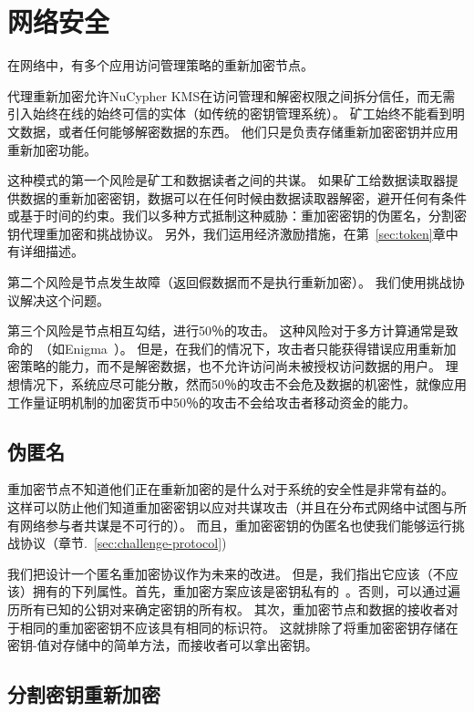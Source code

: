 \documentclass[longbibliography,nofootinbib]{revtex4-1}
\begin{document}
\section{网络安全}

在网络中，有多个应用访问管理策略的重新加密节点。

    代理重新加密允许NuCypher KMS在访问管理和解密权限之间拆分信任，而无需引入始终在线的始终可信的实体（如传统的密钥管理系统）。 矿工始终不能看到明文数据，或者任何能够解密数据的东西。 他们只是负责存储重新加密密钥并应用重新加密功能。
    
    这种模式的第一个风险是矿工和数据读者之间的共谋。 如果矿工给数据读取器提供数据的重新加密密钥，数据可以在任何时候由数据读取器解密，避开任何有条件或基于时间的约束。我们以多种方式抵制这种威胁：重加密密钥的伪匿名，分割密钥代理重加密和挑战协议。 另外，我们运用经济激励措施，在第~\ref{sec:token}章中有详细描述。

第二个风险是节点发生故障（返回假数据而不是执行重新加密）。 我们使用挑战协议解决这个问题。

第三个风险是节点相互勾结，进行50％的攻击。 这种风险对于多方计算通常是致命的~\cite{vitalik-secret-dao}（如Enigma~\cite{enigma}）。 但是，在我们的情况下，攻击者只能获得错误应用重新加密策略的能力，而不是解密数据，也不允许访问尚未被授权访问数据的用户。 理想情况下，系统应尽可能分散，然而50％的攻击不会危及数据的机密性，就像应用工作量证明机制的加密货币中50％的攻击不会给攻击者移动资金的能力。

\subsection{伪匿名}
\label{sec:anonymity}

重加密节点不知道他们正在重新加密的是什么对于系统的安全性是非常有益的。 这样可以防止他们知道重加密密钥以应对共谋攻击（并且在分布式网络中试图与所有网络参与者共谋是不可行的）。 而且，重加密密钥的伪匿名也使我们能够运行挑战协议（章节.~\ref{sec:challenge-protocol})

我们把设计一个匿名重加密协议作为未来的改进。 但是，我们指出它应该（不应该）拥有的下列属性。首先，重加密方案应该是密钥私有的~\cite{Ateniese-key-private,lwe-reencryption}。否则，可以通过遍历所有已知的公钥对来确定密钥的所有权。 其次，重加密节点和数据的接收者对于相同的重加密密钥不应该具有相同的标识符。 这就排除了将重加密密钥存储在密钥-值对存储中的简单方法，而接收者可以拿出密钥。

\subsection{分割密钥重新加密}
\label{sec:split-key}
\end{document}
